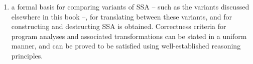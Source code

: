 \begin{enumerate}
\item  
a formal basis for comparing variants of SSA -- such as the variants
discussed elsewhere in this book --, for translating between these
variants, and for constructing and destructing SSA is
obtained. Correctness criteria for program analyses and associated
transformations can be stated in a uniform manner, and can be proved
to be satisfied using well-established reasoning principles.

%

\end{enumerate}



